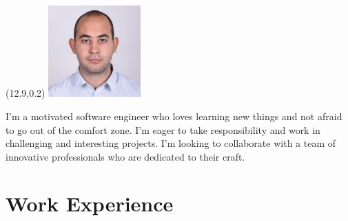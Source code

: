 \documentclass[11pt,a4paper,sans]{moderncv}        %
\begin{document}
\makecvtitle
\begin{textblock}{0}(12.9,0.2)
  \includegraphics[width=100pt]{picture}\par
\end{textblock}




\small{I'm a motivated software engineer who loves learning new things and not afraid to go out of the comfort zone. I'm eager to take responsibility and work in challenging and interesting projects.
I'm looking to collaborate with a team of innovative professionals who are dedicated to their craft.}

\section{Work Experience}

\vspace{6pt}
\end{document}
